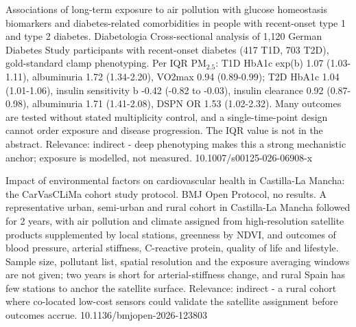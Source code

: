 \documentclass[10pt]{article}
\begin{document}
\par{}\baselineskip{}\baselineskip
{}

{Associations of long-term exposure to air pollution with glucose homeostasis biomarkers and diabetes-related comorbidities in people with recent-onset type 1 and type 2 diabetes.}
{Diabetologia}
{Cross-sectional analysis of 1,120 German Diabetes Study participants with recent-onset diabetes (417 T1D, 703 T2D), gold-standard clamp phenotyping. Per IQR PM$_{2.5}$: T1D HbA1c exp(b) 1.07 (1.03-1.11), albuminuria 1.72 (1.34-2.20), VO2max 0.94 (0.89-0.99); T2D HbA1c 1.04 (1.01-1.06), insulin sensitivity b -0.42 (-0.82 to -0.03), insulin clearance 0.92 (0.87-0.98), albuminuria 1.71 (1.41-2.08), DSPN OR 1.53 (1.02-2.32). Many outcomes are tested without stated multiplicity control, and a single-time-point design cannot order exposure and disease progression. The IQR value is not in the abstract. Relevance: indirect - deep phenotyping makes this a strong mechanistic anchor; exposure is modelled, not measured.}
{10.1007/s00125-026-06908-x}

{Impact of environmental factors on cardiovascular health in Castilla-La Mancha: the CarVasCLiMa cohort study protocol.}
{BMJ Open}
{Protocol, no results. A representative urban, semi-urban and rural cohort in Castilla-La Mancha followed for 2 years, with air pollution and climate assigned from high-resolution satellite products supplemented by local stations, greenness by NDVI, and outcomes of blood pressure, arterial stiffness, C-reactive protein, quality of life and lifestyle. Sample size, pollutant list, spatial resolution and the exposure averaging windows are not given; two years is short for arterial-stiffness change, and rural Spain has few stations to anchor the satellite surface. Relevance: indirect - a rural cohort where co-located low-cost sensors could validate the satellite assignment before outcomes accrue.}
{10.1136/bmjopen-2026-123803}

\par{}\baselineskip{}\baselineskip
{}
\end{document}
